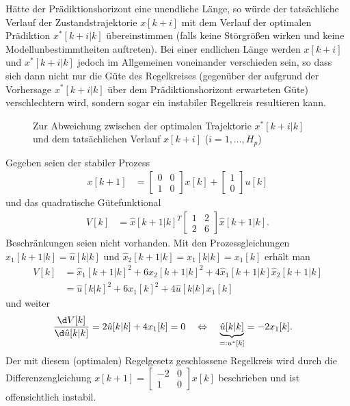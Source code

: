 Hätte der Prädiktionshorizont eine unendliche Länge, so würde der tatsächliche Verlauf der Zustandstrajektorie $x[k+i]$ mit dem Verlauf der optimalen Prädiktion $x^{\ast}[k+i|k]$
übereinstimmen (falls keine Störgrößen wirken und keine Modellunbestimmtheiten auftreten). Bei einer endlichen Länge werden $x[k+i]$ und $x^{\ast}[k+i|k]$ jedoch im Allgemeinen
voneinander verschieden sein, so dass sich dann nicht nur die Güte des Regelkreises (gegenüber der aufgrund der Vorhersage $x^{\ast}[k+i|k]$ über dem Prädiktionshorizont erwarteten
Güte) verschlechtern wird, sondern sogar ein instabiler Regelkreis resultieren kann.
\begin{figure}[htb]
	\centering
	
	\caption{Zur Abweichung zwischen der optimalen Trajektorie $x^{\ast}[k+i|k]$ und dem tatsächlichen Verlauf $x[k+i]$ ($i=1,\ldots,H_p$)}
	\label{fig:kap_4_abweichung_opt_tatsaechlich_verlauf}
\end{figure}
\begin{exmp}
Gegeben seien der stabiler Prozess
\begin{align*}
	x[k+1] & = \begin{bmatrix}
	0 & 0\\ 1 & 0
	\end{bmatrix}x[k]+\begin{bmatrix}
	1\\ 0
	\end{bmatrix}u[k]
\end{align*}
und das quadratische Gütefunktional
\begin{align*}
	V[k] & = \hat{x}[k+1|k]^T\begin{bmatrix}
	1 & 2\\ 2& 6
	\end{bmatrix}\hat{x}[k+1|k].
\end{align*}
Beschränkungen seien nicht vorhanden. Mit den Prozessgleichungen $\hat{x}_1[k+1|k]=\hat{u}[k|k]$ und $\hat{x}_2[k+1|k]=x_1[k|k]=x_1[k]$ erhält man
\begin{align*}
	V[k] & = \hat{x}_1[k+1|k]^2+6\hat{x}_2[k+1|k]^2+4\hat{x}_1[k+1|k]\hat{x}_2[k+1|k]\\
		 & = \hat{u}[k|k]^2+6x_1[k]^2+4\hat{u}[k|k]x_1[k]
\end{align*}
und weiter
\begin{align*}
\frac{\d V[k]}{\d\hat{u}[k|k]} & = 2\hat{u}[k|k]+4 x_1[k]=0\quad \Leftrightarrow\quad \underbrace{\hat{u}[k|k]}_{=:u^{\ast}[k]}=-2x_1[k].
\end{align*}
Der mit diesem (optimalen) Regelgesetz geschlossene Regelkreis wird durch die Differenzengleichung $x[k+1]=\begin{bmatrix}-2 & 0\\ 1 & 0 \end{bmatrix}x[k]$ beschrieben und ist
offensichtlich instabil.
\end{exmp}

